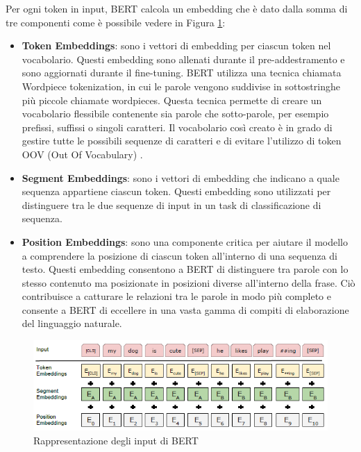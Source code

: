 \documentclass[../../Thesis.tex]{subfiles}
\begin{document}
Per ogni token in input, BERT calcola un embedding che è dato dalla somma di tre componenti come è possibile vedere in Figura \ref{fig:bert_embedding}:
\begin{itemize}
    \item \textbf{Token Embeddings}: sono i vettori di embedding per ciascun token nel vocabolario. Questi embedding sono allenati durante il pre-addestramento e sono aggiornati durante il fine-tuning. BERT utilizza una tecnica chiamata Wordpiece tokenization, in cui le parole vengono
    suddivise in sottostringhe più piccole chiamate wordpieces. Questa tecnica permette di
    creare un vocabolario flessibile contenente sia parole che sotto-parole, per esempio
    prefissi, suffissi o singoli caratteri. Il vocabolario così creato è in grado di gestire tutte le
    possibili sequenze di caratteri e di evitare l’utilizzo di token OOV (Out Of Vocabulary) \cite{WordPiece}.
    \item \textbf{Segment Embeddings}: sono i vettori di embedding che indicano a quale sequenza appartiene ciascun token. Questi embedding sono utilizzati per distinguere tra le due sequenze di input in un task di classificazione di sequenza.
    \item \textbf{Position Embeddings}: sono una componente critica per aiutare il modello a comprendere la posizione di ciascun token all’interno di una sequenza di testo. Questi embedding consentono a BERT di distinguere tra parole con lo stesso contenuto ma posizionate in posizioni diverse all’interno della frase. Ciò contribuisce a catturare le relazioni tra le parole in modo più completo e consente a BERT di eccellere in una vasta gamma di compiti di elaborazione del linguaggio naturale.
\end{itemize}

\begin{figure}[H]
    \centering
    \includegraphics[width=\textwidth]{../../img/bert-input.png}
    \caption{Rappresentazione degli input di BERT}
    \label{fig:bert_embedding}
\end{figure}
\end{document}
